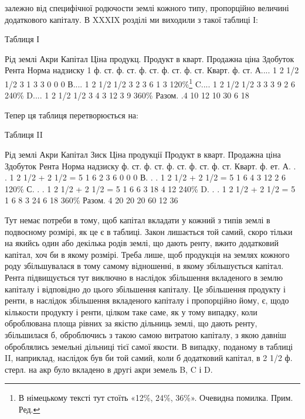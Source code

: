 \parcont{}  %
залежно від специфічної родючости землі кожного типу, пропорційно величині
додаткового капіталу. В XXXIX розділі ми виходили з такої таблиці І:

Таблиця І

Рід землі    Акри Капітал    Ціна продукц. Продукт в кварт.
Продажна  ціна    Здобуток    Рента    Норма  надзиску
        1 ф. ст. ф. ст. ф. ст. ф. ст. ф. ст. Кварт. ф. ст.
А....    1    2 1/2    1/2    3    1    3    3    0    0    0
В....    1    2 1/2    1/2    3    2    3    6    1    3    120\%\footnote*{
В німецькому тексті тут стоїть «12\%, 24\%, 36\%». Очевидна помилка. Прим. Ред.
}
C....    1    2 1/2    1/2    3    3    3    9    2    6    240\%
D....    1    2 1/2    1/2    3    4    3    12    3    9    360\%
Разом. .4    10               12    10        30    6    18

Тепер ця таблиця перетворюється на:

Таблиця II

Рід  землі    Акри  Капітал    Зиск    Ціна продукції Продукт в кварт.
Продажна  ціна    Здобуток    Рента    Норма  надзиску
        ф. ст. ф. ст. ф. ст. ф. ст. ф. ст. Кварт. ф. ет.
А. . .    1    2 1/2 + 2 1/2 = 5    1    6    2    3    6    0    0    0
В. . .    1    2 1/2 + 2 1/2 = 5    1    6    4    3    12    2    6    120\%
С. . .    1    2 1/2 + 2 1/2 = 5    1    6    6    3    18    4    12    240\%
D. . .    1    2 1/2 + 2 1/2 = 5    1    6    8    3    24    6    18    360\%
Разом.    4          20            20        20            60    12    36

Тут немає потреби в тому, щоб капітал вкладати у кожний з типів землі
в подвоєному розмірі, як це є в таблиці. Закон лишається той самий, скоро
тільки на якийсь один або декілька родів землі, що дають ренту, вжито додатковий капітал, хоч би в
якому розмірі. Треба лише, щоб продукція на землях
кожного роду збільшувалася в тому самому відношенні, в якому збільшується
капітал. Рента підвищується тут виключно в наслідок збільшення вкладеного
в землю капіталу і відповідно до цього збільшення капіталу. Це збільшення
продукту і ренти, в наслідок збільшення вкладеного капіталу і пропорційно
йому, є,  щодо кількости продукту і ренти, цілком таке саме, як у тому випадку,
коли оброблювана площа рівних за якістю дільниць землі, що дають ренту,
збільшилася б, оброблючись з такою самою витратою капіталу, з якою давніш оброблялись земельні
дільниці тієї самої якости. В випадку, поданому в таблиці II, наприклад, наслідок був би той самий,
коли б додатковий капітал,
в 2 1/2 ф. стерл. на акр було вкладено в другі акри земель B, C і D.
